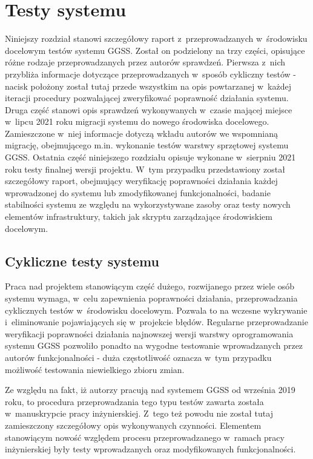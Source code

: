 \chapter{Testy systemu}
\label{cha:tests}

\graphicspath{{6_tests/static/}}

Niniejszy rozdział stanowi szczegółowy raport z~przeprowadzanych w~środowisku docelowym testów systemu GGSS. Został on podzielony na trzy części, opisujące różne rodzaje przeprowadzanych przez autorów sprawdzeń. Pierwsza z~nich przybliża informacje dotyczące przeprowadzanych w~sposób cykliczny testów - nacisk położony został tutaj przede wszystkim na opis powtarzanej w~każdej iteracji procedury pozwalającej zweryfikować poprawność działania systemu. Druga część stanowi opis sprawdzeń wykonywanych w~czasie mającej miejsce w~lipcu 2021 roku migracji systemu do nowego środowiska docelowego. Zamieszczone w~niej informacje dotyczą wkładu autorów we wspomnianą migrację, obejmującego m.in. wykonanie testów warstwy sprzętowej systemu GGSS. Ostatnia część niniejszego rozdziału opisuje wykonane w~sierpniu 2021 roku testy finalnej wersji projektu. W~tym przypadku przedstawiony został szczegółowy raport, obejmujący weryfikację poprawności działania każdej wprowadzonej do systemu lub zmodyfikowanej funkcjonalności, badanie stabilności systemu ze względu na wykorzystywane zasoby oraz testy nowych elementów infrastruktury, takich jak skryptu zarządzające środowiskiem docelowym.

\section{Cykliczne testy systemu}
Praca nad projektem stanowiącym część dużego, rozwijanego przez wiele osób systemu wymaga, w~celu zapewnienia poprawności działania, przeprowadzania cyklicznych testów w~środowisku docelowym. Pozwala to na wczesne wykrywanie i~eliminowanie pojawiających się w~projekcie błędów. Regularne przeprowadzanie weryfikacji poprawności działania najnowszej wersji warstwy oprogramowania systemu GGSS pozwoliło ponadto na wygodne testowanie wprowadzanych przez autorów funkcjonalności - duża częstotliwość oznacza w~tym przypadku możliwość testowania niewielkiego zbioru zmian.

Ze względu na fakt, iż autorzy pracują nad systemem GGSS od września 2019 roku, to procedura przeprowadzania tego typu testów zawarta została w~manuskrypcie pracy inżynierskiej. Z~tego też powodu nie został tutaj zamieszczony szczegółowy opis wykonywanych czynności. Elementem stanowiącym nowość względem procesu przeprowadzanego w~ramach pracy inżynierskiej były testy wprowadzanych oraz modyfikowanych funkcjonalności. 

